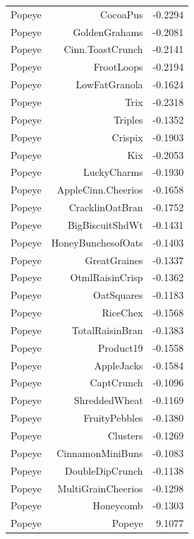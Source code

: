 \begin{longtable}{@{}lrr@{}}
Popeye & CocoaPus & -0.2294 \\
Popeye & GoldenGrahams & -0.2081 \\
Popeye & Cinn.ToastCrunch & -0.2141 \\
Popeye & FrootLoops & -0.2194 \\
Popeye & LowFatGranola & -0.1624 \\
Popeye & Trix & -0.2318 \\
Popeye & Triples & -0.1352 \\
Popeye & Crispix & -0.1903 \\
Popeye & Kix & -0.2053 \\
Popeye & LuckyCharms & -0.1930 \\
Popeye & AppleCinn.Cheerios & -0.1658 \\
Popeye & CracklinOatBran & -0.1752 \\
Popeye & BigBiscuitShdWt & -0.1431 \\
Popeye & HoneyBunchesofOats & -0.1403 \\
Popeye & GreatGraines & -0.1337 \\
Popeye & OtmlRaisinCrisp & -0.1362 \\
Popeye & OatSquares & -0.1183 \\
Popeye & RiceChex & -0.1568 \\
Popeye & TotalRaisinBran & -0.1383 \\
Popeye & Product19 & -0.1558 \\
Popeye & AppleJacks & -0.1584 \\
Popeye & CaptCrunch & -0.1096 \\
Popeye & ShreddedWheat & -0.1169 \\
Popeye & FruityPebbles & -0.1380 \\
Popeye & Clusters & -0.1269 \\
Popeye & CinnamonMiniBuns & -0.1083 \\
Popeye & DoubleDipCrunch & -0.1138 \\
Popeye & MultiGrainCheerios & -0.1298 \\
Popeye & Honeycomb & -0.1303 \\
Popeye & Popeye & 9.1077 \\
\bottomrule
\end{longtable}
\endgroup